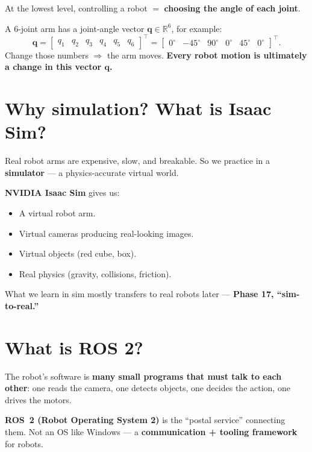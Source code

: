 \documentclass[11pt]{article}
\begin{document}
At the lowest level, controlling a robot $=$ \textbf{choosing the angle of each joint}.

A 6-joint arm has a joint-angle vector $\mathbf{q} \in \mathbb{R}^6$, for example:
\[
  \mathbf{q} =
  \begin{bmatrix}
    q_1 & q_2 & q_3 & q_4 & q_5 & q_6
  \end{bmatrix}^\top
  =
  \begin{bmatrix}
    0^\circ & -45^\circ & 90^\circ & 0^\circ & 45^\circ & 0^\circ
  \end{bmatrix}^\top .
\]
Change those numbers $\Rightarrow$ the arm moves.
\textbf{Every robot motion is ultimately a change in this vector $\mathbf{q}$.}

\section{Why simulation? What is Isaac Sim?}

Real robot arms are expensive, slow, and breakable. So we practice in a
\textbf{simulator} --- a physics-accurate virtual world.

\textbf{NVIDIA Isaac Sim} gives us:
\begin{itemize}[leftmargin=*]
  \item A virtual robot arm.
  \item Virtual cameras producing real-looking images.
  \item Virtual objects (red cube, box).
  \item Real physics (gravity, collisions, friction).
\end{itemize}

What we learn in sim mostly transfers to real robots later
--- \textbf{Phase 17, ``sim-to-real.''}

\section{What is ROS 2?}

The robot's software is \textbf{many small programs that must talk to each other}:
one reads the camera, one detects objects, one decides the action, one drives the motors.

\textbf{ROS~2 (Robot Operating System 2)} is the ``postal service'' connecting them.
Not an OS like Windows --- a \textbf{communication + tooling framework} for robots.
\end{document}
